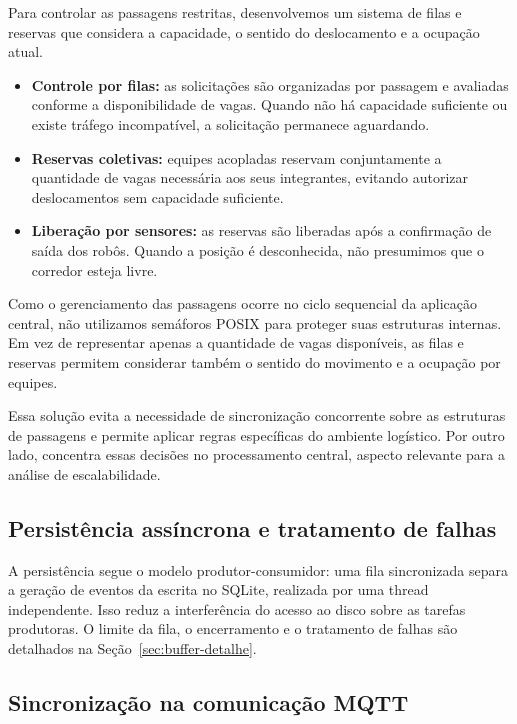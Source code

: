 \documentclass[12pt,a4paper]{article}
\begin{document}
Para controlar as passagens restritas, desenvolvemos um sistema de filas e
reservas que considera a capacidade, o sentido do deslocamento e a ocupação
atual.

\begin{itemize}
    \item \textbf{Controle por filas:} as solicitações são
          organizadas por passagem e avaliadas conforme a
          disponibilidade de vagas. Quando não há capacidade
          suficiente ou existe tráfego incompatível, a
          solicitação permanece aguardando.

    \item \textbf{Reservas coletivas:} equipes acopladas
          reservam conjuntamente a quantidade de vagas
          necessária aos seus integrantes, evitando autorizar
          deslocamentos sem capacidade suficiente.

    \item \textbf{Liberação por sensores:} as reservas
          são liberadas após a confirmação de saída dos robôs.
          Quando a posição é desconhecida, não presumimos
          que o corredor esteja livre.
\end{itemize}

Como o gerenciamento das passagens ocorre no ciclo sequencial da aplicação
central, não utilizamos semáforos POSIX para proteger suas estruturas internas.
Em vez de representar apenas a quantidade de vagas disponíveis, as filas e
reservas permitem considerar também o sentido do movimento e a ocupação por
equipes.

Essa solução evita a necessidade de sincronização concorrente sobre as
estruturas de passagens e permite aplicar regras específicas do ambiente
logístico. Por outro lado, concentra essas decisões no processamento central,
aspecto relevante para a análise de escalabilidade.

\subsection{Persistência assíncrona e tratamento de falhas}

A persistência segue o modelo produtor-consumidor: uma fila sincronizada separa
a geração de eventos da escrita no SQLite, realizada por uma thread
independente. Isso reduz a interferência do acesso ao disco sobre as tarefas
produtoras. O limite da fila, o encerramento e o tratamento de falhas são
detalhados na Seção~\ref{sec:buffer-detalhe}.

\subsection{Sincronização na comunicação MQTT}
\end{document}
